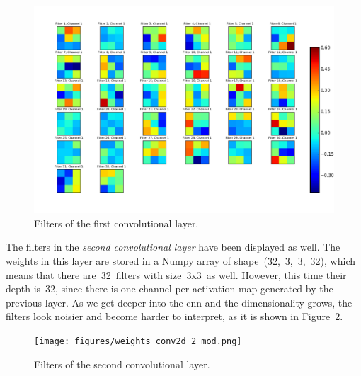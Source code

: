 \begin{figure}
	\centering
	\includegraphics[width=0.92\linewidth, keepaspectratio]{figures/weights_conv2d_1.png}
	\caption{Filters of the first convolutional layer.}
	\label{fig:filters}
\end{figure}

The filters in the \emph{second convolutional layer} have been displayed as well. The weights in this layer are stored in a Numpy array of shape~(32,~3,~3,~32), which means that there are~32~filters with size~3x3~as well. However, this time their depth is~32, since there is one channel per activation map generated by the previous layer. As we get deeper into the \gls{cnn} and the dimensionality grows, the filters look noisier and become harder to interpret, as it is shown in Figure~\ref{fig:filters2}.
\begin{figure}
	\centering
	\texttt{[image: figures/weights\_conv2d\_2\_mod.png]}
	\caption{Filters of the second convolutional layer.}
	\label{fig:filters2}
\end{figure}


